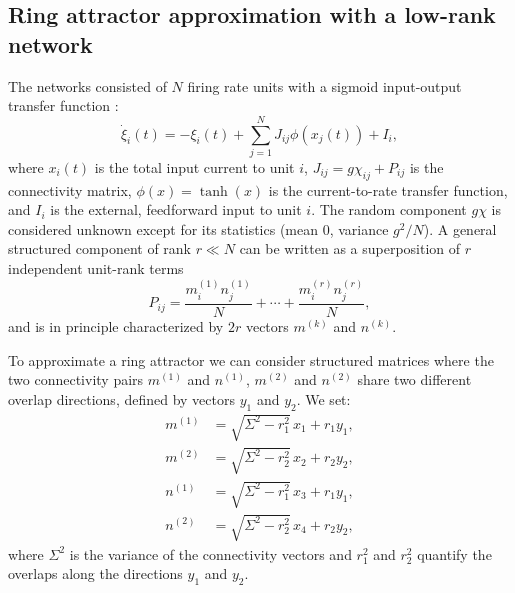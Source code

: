 \documentclass{article} %
\newcounter{ct}
\theoremstyle{definition}
\theoremstyle{remark}
\begin{document}



\subsection{Ring attractor approximation with a low-rank network}\label{sec:supp:lowrank}
The networks consisted of \(N\) firing rate units with a sigmoid input-output transfer function \citep{mastrogiuseppe2018}:
\begin{equation}
\dot \xi_{i}(t) = - \xi_{i}(t) + \sum_{j = 1}^{N} J_{ij}\phi(x_{j}(t)) + I_{i},
\label{eq:1}
\end{equation}where \(x_{i}(t)\) is the total input current to unit \(i\),
\( J_{ij} = g\chi_{ij} + P_{ij}\) is the connectivity matrix,
\(\phi(x) = \tanh(x)\) is the current-to-rate transfer function, and \(I_{i}\) is the external, feedforward input to unit \(i\).
The random component \(g\chi\) is considered unknown except for its statistics (mean 0, variance \(g^{2}/N\)).
A general structured component of rank \(r\ll N\) can be written as a superposition of \(r\) independent unit-rank terms
\begin{equation}
P_{ij} = \frac{m_{i}^{(1)} n_{j}^{(1)}}{N} + \cdots + \frac{m_{i}^{(r)} n_{j}^{(r)}}{N},
\end{equation} and is in principle characterized by \(2r\) vectors \(m^{(k)}\) and \(n^{(k)}\).

To approximate a ring attractor we can consider structured matrices where the two connectivity pairs \( m^{(1)} \) and \( n^{(1)} \), \( m^{(2)} \) and \( n^{(2)} \) share two different overlap directions, defined by vectors \( y_{1} \) and \( y_{2} \). We set:
\begin{align}
    m^{(1)} &= \sqrt{\Sigma^{2} - r_{1}^{2}} \, x_{1} + r_{1} y_{1}, \\
    m^{(2)} &= \sqrt{\Sigma^{2} - r_{2}^{2}} \, x_{2} + r_{2} y_{2}, \\
    n^{(1)} &= \sqrt{\Sigma^{2} - r_{1}^{2}} \, x_{3} + r_{1} y_{1}, \\
    n^{(2)} &= \sqrt{\Sigma^{2} - r_{2}^{2}} \, x_{4} + r_{2} y_{2},
\end{align}
where \( \Sigma^{2} \) is the variance of the connectivity vectors and \( r_{1}^{2} \) and \( r_{2}^{2} \) quantify the overlaps along the directions \( y_{1} \) and \( y_{2} \).
\end{document}
